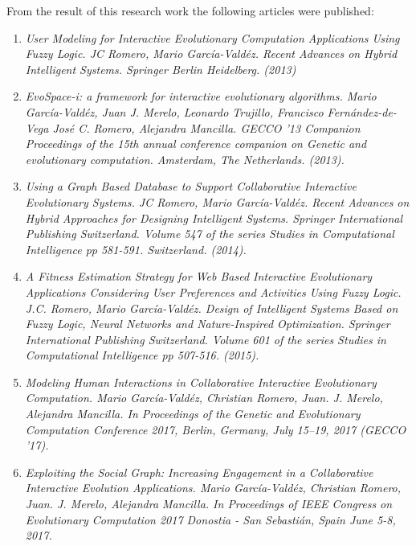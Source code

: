 From the result of this research work the following articles were published:
\begin{enumerate} \item \textit{User Modeling for Interactive Evolutionary
Computation Applications Using Fuzzy Logic. JC Romero, Mario Garc\'ia-Vald\'ez.
Recent Advances on Hybrid Intelligent Systems. Springer Berlin Heidelberg.
(2013)} \item \textit{ EvoSpace-i: a framework for interactive evolutionary
algorithms. Mario Garc\'ia-Vald\'ez, 	Juan J. Merelo, 	Leonardo Trujillo,
Francisco Fernández-de-Vega Jos\'e C. Romero, 	Alejandra Mancilla. GECCO '13
Companion Proceedings of the 15th annual conference  companion on Genetic and
evolutionary computation. Amsterdam, The Netherlands. (2013).} \item
\textit{Using a Graph Based Database to Support Collaborative Interactive
Evolutionary Systems.  JC Romero, Mario Garc\'ia-Vald\'ez. Recent Advances on
Hybrid Approaches for Designing Intelligent Systems. Springer International
Publishing Switzerland. Volume 547 of the series Studies in Computational
Intelligence pp 581-591. Switzerland. (2014).} \item \textit{A Fitness
Estimation Strategy for Web Based Interactive Evolutionary Applications
Considering User Preferences and Activities Using Fuzzy Logic. J.C. Romero,
Mario Garc\'ia-Vald\'ez. Design of Intelligent Systems Based on Fuzzy Logic,
Neural Networks and Nature-Inspired Optimization. Springer International
Publishing Switzerland. Volume 601 of the series Studies in Computational
Intelligence pp 507-516. (2015).}
\item \textit{Modeling Human Interactions in
Collaborative Interactive Evolutionary Computation.  Mario Garc\'ia-Vald\'ez,
Christian Romero, Juan. J. Merelo, Alejandra Mancilla.  In Proceedings of the Genetic and Evolutionary Computation
Conference 2017, Berlin, Germany, July 15–19, 2017 (GECCO ’17).}
\item \textit{Exploiting the Social Graph: Increasing Engagement in a Collaborative Interactive Evolution Applications.
Mario Garc\'ia-Vald\'ez,
Christian Romero, Juan. J. Merelo, Alejandra Mancilla.  In Proceedings of IEEE Congress on Evolutionary Computation 2017
Donostia - San Sebastián, Spain
June 5-8, 2017.}

\end{enumerate}

